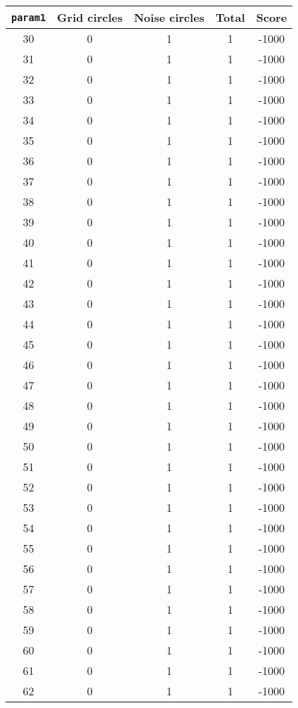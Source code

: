 \documentclass[letterpaper, 12pt]{article}
\begin{document}
\begin{longtable}{|c|c|c|c|c|}
\hline
\textbf{\texttt{param1}} & \textbf{Grid circles} & \textbf{Noise circles} & \textbf{Total} & \textbf{Score} \\
\hline
30 & 0 & 1 & 1 & -1000 \\
\hline
31 & 0 & 1 & 1 & -1000 \\
\hline
32 & 0 & 1 & 1 & -1000 \\
\hline
33 & 0 & 1 & 1 & -1000 \\
\hline
34 & 0 & 1 & 1 & -1000 \\
\hline
35 & 0 & 1 & 1 & -1000 \\
\hline
36 & 0 & 1 & 1 & -1000 \\
\hline
37 & 0 & 1 & 1 & -1000 \\
\hline
38 & 0 & 1 & 1 & -1000 \\
\hline
39 & 0 & 1 & 1 & -1000 \\
\hline
40 & 0 & 1 & 1 & -1000 \\
\hline
41 & 0 & 1 & 1 & -1000 \\
\hline
42 & 0 & 1 & 1 & -1000 \\
\hline
43 & 0 & 1 & 1 & -1000 \\
\hline
44 & 0 & 1 & 1 & -1000 \\
\hline
45 & 0 & 1 & 1 & -1000 \\
\hline
46 & 0 & 1 & 1 & -1000 \\
\hline
47 & 0 & 1 & 1 & -1000 \\
\hline
48 & 0 & 1 & 1 & -1000 \\
\hline
49 & 0 & 1 & 1 & -1000 \\
\hline
50 & 0 & 1 & 1 & -1000 \\
\hline
51 & 0 & 1 & 1 & -1000 \\
\hline
52 & 0 & 1 & 1 & -1000 \\
\hline
53 & 0 & 1 & 1 & -1000 \\
\hline
54 & 0 & 1 & 1 & -1000 \\
\hline
55 & 0 & 1 & 1 & -1000 \\
\hline
56 & 0 & 1 & 1 & -1000 \\
\hline
57 & 0 & 1 & 1 & -1000 \\
\hline
58 & 0 & 1 & 1 & -1000 \\
\hline
59 & 0 & 1 & 1 & -1000 \\
\hline
60 & 0 & 1 & 1 & -1000 \\
\hline
61 & 0 & 1 & 1 & -1000 \\
\hline
62 & 0 & 1 & 1 & -1000 \\

\end{longtable}
\end{document}
